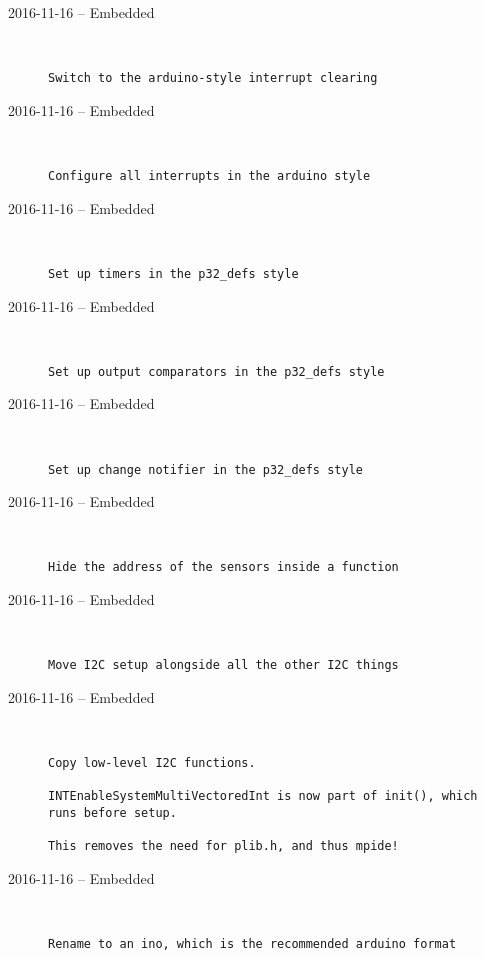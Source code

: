 \begin{description}
  \item[2016-11-16 -- Embedded] \hfill \
\begin{lstlisting}
Switch to the arduino-style interrupt clearing
\end{lstlisting}


  \item[2016-11-16 -- Embedded] \hfill \
\begin{lstlisting}
Configure all interrupts in the arduino style
\end{lstlisting}


  \item[2016-11-16 -- Embedded] \hfill \
\begin{lstlisting}
Set up timers in the p32_defs style
\end{lstlisting}


  \item[2016-11-16 -- Embedded] \hfill \
\begin{lstlisting}
Set up output comparators in the p32_defs style
\end{lstlisting}


  \item[2016-11-16 -- Embedded] \hfill \
\begin{lstlisting}
Set up change notifier in the p32_defs style
\end{lstlisting}


  \item[2016-11-16 -- Embedded] \hfill \
\begin{lstlisting}
Hide the address of the sensors inside a function
\end{lstlisting}


  \item[2016-11-16 -- Embedded] \hfill \
\begin{lstlisting}
Move I2C setup alongside all the other I2C things
\end{lstlisting}


  \item[2016-11-16 -- Embedded] \hfill \
\begin{lstlisting}
Copy low-level I2C functions.

INTEnableSystemMultiVectoredInt is now part of init(), which runs before setup.

This removes the need for plib.h, and thus mpide!
\end{lstlisting}


  \item[2016-11-16 -- Embedded] \hfill \
\begin{lstlisting}
Rename to an ino, which is the recommended arduino format
\end{lstlisting}



\end{description}
